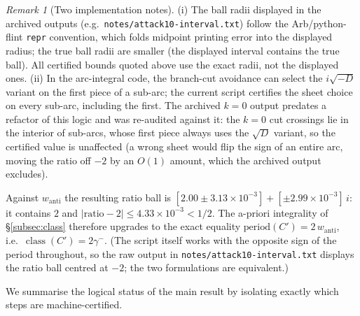 \documentclass[preprint,12pt]{elsarticle}
\theoremstyle{definition}
\theoremstyle{remark}
\newtheorem{remark}[theorem]{Remark}
\DeclareMathOperator{\class}{class}
\begin{document}
\begin{remark}[Two implementation notes]\label{rem:disclosures}
(i) The ball radii displayed in the archived outputs
(e.g.\ \texttt{notes/attack10-interval.txt}) follow the Arb/python-flint
\texttt{repr} convention, which folds midpoint printing error into the
displayed radius; the true ball radii are smaller (the displayed interval
contains the true ball). All certified bounds quoted above use the exact
radii, not the displayed ones.
(ii) In the arc-integral code, the branch-cut avoidance can select the
$i\sqrt{-D}$ variant on the first piece of a sub-arc; the current script
certifies the sheet choice on every sub-arc, including the first. The
archived $k=0$ output predates a refactor of this logic and was re-audited
against it: the $k=0$ cut crossings lie in the interior of sub-arcs, whose
first piece always uses the $\sqrt D$ variant, so the certified value is
unaffected (a wrong sheet would flip the sign of an entire arc, moving the
ratio off $-2$ by an $O(1)$ amount, which the archived output excludes).
\end{remark}
Against $w_{\mathrm{anti}}$ the resulting ratio ball is
$[2.00\pm3.13\times10^{-3}]+[\pm2.99\times10^{-3}]\,i$: it contains $2$ and
$|\mathrm{ratio}-2|\le4.33\times10^{-3}<1/2$.  The a-priori integrality of
\S\ref{subsec:class} therefore upgrades to the exact equality
$\mathrm{period}(C')=2\,w_{\mathrm{anti}}$, i.e.\ $\class(C')=2\gamma^{-}$.
(The script itself works with the opposite sign of the period throughout, so
the raw output in \texttt{notes/attack10-interval.txt} displays the ratio
ball centred at $-2$; the two formulations are equivalent.)

We summarise the logical status of the main result by isolating exactly
which steps are machine-certified.
\end{document}
